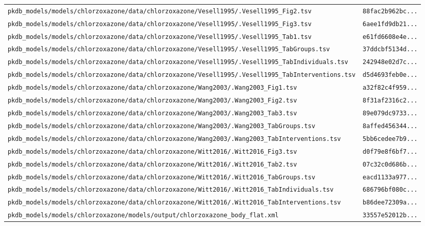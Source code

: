 \documentclass{article}
\begin{document}
\begin{longtable}{ll}
\texttt{pkdb\_models/models/chlorzoxazone/data/chlorzoxazone/Vesell1995/.Vesell1995\_Fig2.tsv} & \texttt{88fac2b962bc...} \\
\texttt{pkdb\_models/models/chlorzoxazone/data/chlorzoxazone/Vesell1995/.Vesell1995\_Fig3.tsv} & \texttt{6aee1fd9db21...} \\
\texttt{pkdb\_models/models/chlorzoxazone/data/chlorzoxazone/Vesell1995/.Vesell1995\_Tab1.tsv} & \texttt{e61fd6608e4e...} \\
\texttt{pkdb\_models/models/chlorzoxazone/data/chlorzoxazone/Vesell1995/.Vesell1995\_TabGroups.tsv} & \texttt{37ddcbf5134d...} \\
\texttt{pkdb\_models/models/chlorzoxazone/data/chlorzoxazone/Vesell1995/.Vesell1995\_TabIndividuals.tsv} & \texttt{242948e02d7c...} \\
\texttt{pkdb\_models/models/chlorzoxazone/data/chlorzoxazone/Vesell1995/.Vesell1995\_TabInterventions.tsv} & \texttt{d5d4693feb0e...} \\
\texttt{pkdb\_models/models/chlorzoxazone/data/chlorzoxazone/Wang2003/.Wang2003\_Fig1.tsv} & \texttt{a32f82c4f959...} \\
\texttt{pkdb\_models/models/chlorzoxazone/data/chlorzoxazone/Wang2003/.Wang2003\_Fig2.tsv} & \texttt{8f31af2316c2...} \\
\texttt{pkdb\_models/models/chlorzoxazone/data/chlorzoxazone/Wang2003/.Wang2003\_Tab3.tsv} & \texttt{89e079dc9733...} \\
\texttt{pkdb\_models/models/chlorzoxazone/data/chlorzoxazone/Wang2003/.Wang2003\_TabGroups.tsv} & \texttt{8affed456344...} \\
\texttt{pkdb\_models/models/chlorzoxazone/data/chlorzoxazone/Wang2003/.Wang2003\_TabInterventions.tsv} & \texttt{5bb6cedee7b9...} \\
\texttt{pkdb\_models/models/chlorzoxazone/data/chlorzoxazone/Witt2016/.Witt2016\_Fig3.tsv} & \texttt{d0f79e8f6bf7...} \\
\texttt{pkdb\_models/models/chlorzoxazone/data/chlorzoxazone/Witt2016/.Witt2016\_Tab2.tsv} & \texttt{07c32c0d686b...} \\
\texttt{pkdb\_models/models/chlorzoxazone/data/chlorzoxazone/Witt2016/.Witt2016\_TabGroups.tsv} & \texttt{eacd1133a977...} \\
\texttt{pkdb\_models/models/chlorzoxazone/data/chlorzoxazone/Witt2016/.Witt2016\_TabIndividuals.tsv} & \texttt{686796bf080c...} \\
\texttt{pkdb\_models/models/chlorzoxazone/data/chlorzoxazone/Witt2016/.Witt2016\_TabInterventions.tsv} & \texttt{b86dee72309a...} \\
\texttt{pkdb\_models/models/chlorzoxazone/models/output/chlorzoxazone\_body\_flat.xml} & \texttt{33557e52012b...} \\
\end{longtable}
\end{document}
